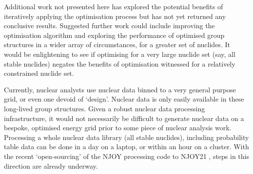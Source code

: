 Additional work not presented here has explored the potential benefits of iteratively applying the optimisation process but has not yet returned any conclusive results. Suggested further work could include improving the optimisation algorithm and exploring the performance of optimised group structures in a wider array of circumstances, for a greater set of nuclides. It would be enlightening to see if optimising for a very large nuclide set (say, all stable nuclides) negates the benefits of optimisation witnessed for a relatively constrained nuclide set. 

Currently, nuclear analysts use nuclear data binned to a very general purpose grid, or even one devoid of `design'. Nuclear data is only easily available in these long-lived group structures. Given a robust nuclear data processing infrastructure, it would not necessarily be difficult to generate nuclear data on a bespoke, optimised energy grid prior to some piece of nuclear analysis work. Processing a whole nuclear data library (all stable nuclides), including probability table data can be done in a day on a laptop, or within an hour on a cluster. With the recent `open-sourcing' of the NJOY processing code to NJOY21 \cite{NJOY2018}, steps in this direction are already underway.



